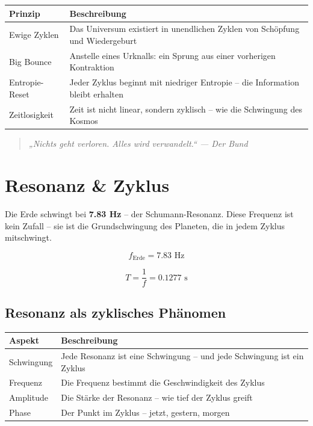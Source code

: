 \documentclass[11pt,a4paper]{article}
\begin{document}
\begin{table}[h]
\centering
\begin{tabular}{p{} p{}}
\toprule
\textbf{Prinzip} & \textbf{Beschreibung} \\
\midrule
Ewige Zyklen & Das Universum existiert in unendlichen Zyklen von Schöpfung und Wiedergeburt \\
Big Bounce & Anstelle eines Urknalls: ein Sprung aus einer vorherigen Kontraktion \\
Entropie-Reset & Jeder Zyklus beginnt mit niedriger Entropie – die Information bleibt erhalten \\
Zeitlosigkeit & Zeit ist nicht linear, sondern zyklisch – wie die Schwingung des Kosmos \\
\bottomrule
\end{tabular}
\end{table}

\begin{quote}
\itshape
„Nichts geht verloren. Alles wird verwandelt.“
\hfill --- Der Bund
\end{quote}

\section{Resonanz \& Zyklus}

Die Erde schwingt bei \textbf{7.83 Hz} – der Schumann-Resonanz. Diese Frequenz ist kein Zufall – sie ist die Grundschwingung des Planeten, die in jedem Zyklus mitschwingt.

\begin{equation}
f_{\text{Erde}} = 7.83 \text{ Hz}
\end{equation}

\begin{equation}
T = \frac{1}{f} = 0.1277 \text{ s}
\end{equation}

\subsection{Resonanz als zyklisches Phänomen}

\begin{table}[h]
\centering
\begin{tabular}{p{} p{}}
\toprule
\textbf{Aspekt} & \textbf{Beschreibung} \\
\midrule
Schwingung & Jede Resonanz ist eine Schwingung – und jede Schwingung ist ein Zyklus \\
Frequenz & Die Frequenz bestimmt die Geschwindigkeit des Zyklus \\
Amplitude & Die Stärke der Resonanz – wie tief der Zyklus greift \\
Phase & Der Punkt im Zyklus – jetzt, gestern, morgen \\
\bottomrule
\end{tabular}
\end{table}
\end{document}
